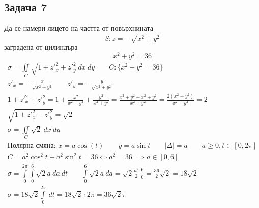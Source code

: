 \documentclass[a4paper,fleqn,12pt]{article}
\theoremstyle{definition}
\begin{document}
\subsection*{Задача 7}
Да се намери лицето на частта от повърхнината 
$$S: z = -\sqrt{x^2 + y^2}$$
заградена от цилиндъра
$$x^2 + y^2 = 36$$
\begin{gather*}
\sigma = \iint\limits_C  \sqrt{1 + z'^2 _x + z'^2 _y} \ dx \ dy \qquad  C: \{ x^2 + y^2 = 36 \} \\
z'_x = - \frac{x}{\sqrt{x^2 + y^2}} \qquad z'_y = - \frac{y}{\sqrt{x^2 + y^2}} \\
1 + z'^2 _x + z'^2 _y = 1 + \frac{x^2}{x^2 + y^2} + \frac{y^2}{x^2 + y^2} = 
\frac{x^2 + y^2 +x^2 + y^2 }{x^2 + y^2} = \frac{2(x^2+y^2)}{x^2 + y^2} = 2 \\
\sqrt{1 + z'^2 _x + z'^2 _y} = \sqrt{2} \\
\sigma = \iint\limits_C \sqrt{2} \ dx \ dy \\
\text{Полярна смяна: }
x = a\cos(t) \qquad y = a \sin t \qquad |\Delta| = a \qquad  a\geq 0, t \in [0,2\pi] \\
C = a^2 \cos^2 t + a^2 \sin^2 t = 36 \Leftrightarrow a^2 = 36 \implies a \in [0,6] \\ 
\sigma = \int\limits_0 ^{2\pi} \int\limits_0 ^6 \sqrt{2} a \ da \ dt \qquad 
\int\limits_0 ^6 \sqrt{2} a \ da = \sqrt{2}\frac{a^2}{2} \Big|_0 ^6 = \frac{36}{2} \sqrt{2} = 18\sqrt{2} \\
\sigma = 18\sqrt{2}  \int\limits_0 ^{2\pi} \ dt = 18\sqrt{2} \cdot  2\pi = 36\sqrt{2} \pi 
\end{gather*} 
\end{document}
